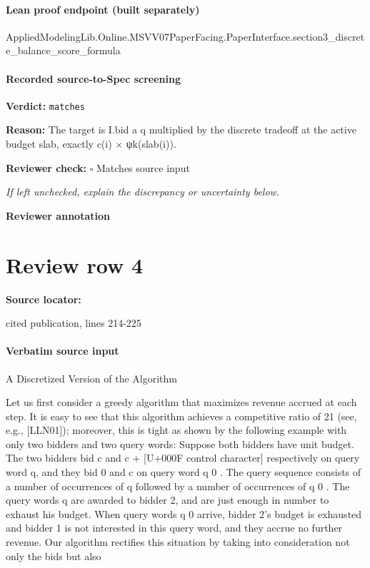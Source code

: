 \documentclass[10pt]{article}
\newcommand{\reviewerbox}{%
  \par\noindent\fbox{\parbox{0.96\linewidth}{\rule{0pt}{0.38in}}}\par
}
\newcommand{\reviewmatch}[1]{%
  \par\noindent\textbf{Reviewer check:} $\square$\; #1\par
  \noindent\emph{If left unchecked, explain the discrepancy or uncertainty below.}\par
}
\begin{document}
\paragraph{Lean proof endpoint (built separately)}\begin{ReviewVerbatim}
AppliedModelingLib.Online.MSVV07PaperFacing.PaperInterface.section3_discrete_balance_score_formula
\end{ReviewVerbatim}

\paragraph{Recorded source-to-Spec screening}
\textbf{Verdict:} \texttt{matches}
\\
{\raggedright
\textbf{Reason:} The target is I.\allowbreak{}bid a q multiplied by the discrete tradeoff at the active budget slab, exactly c(i) × ψk(slab(i)).\allowbreak{}
\par}
\reviewmatch{Matches source input}
\noindent\textbf{Reviewer annotation}\par
\reviewerbox
\clearpage
\hypertarget{source-claim-efe051fbdfc5ae95}{}
\section*{Review row 4}
\textbf{Source locator:} {\footnotesize\raggedright cited publication, lines 214-\allowbreak{}225\par}
\paragraph{Verbatim source input}
\begin{ReviewVerbatim}
A Discretized Version of the Algorithm

Let us first consider a greedy algorithm that maximizes revenue accrued at each step. It is
easy to see that this algorithm achieves a competitive ratio of 21 (see, e.g., [LLN01]); moreover,
this is tight as shown by the following example with only two bidders and two query words:
Suppose both bidders have unit budget. The two bidders bid c and c + [U+000F control character] respectively on query
word q, and they bid 0 and c on query word q 0 . The query sequence consists of a number of
occurrences of q followed by a number of occurrences of q 0 . The query words q are awarded to
bidder 2, and are just enough in number to exhaust his budget. When query words q 0 arrive,
bidder 2’s budget is exhausted and bidder 1 is not interested in this query word, and they
accrue no further revenue.
Our algorithm rectifies this situation by taking into consideration not only the bids but also
\end{ReviewVerbatim}
\end{document}

